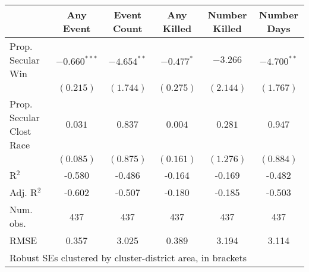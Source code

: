 
\begin{tabular}{l c c c c c }
\hline
 & Any Event & Event Count & Any Killed & Number Killed & Number Days \\
\hline
Prop. Secular Win        & $-0.660^{***}$ & $-4.654^{**}$ & $-0.477^{*}$ & $-3.266$  & $-4.700^{**}$ \\
                         & $(0.215)$      & $(1.744)$     & $(0.275)$    & $(2.144)$ & $(1.767)$     \\
Prop. Secular Clost Race & $0.031$        & $0.837$       & $0.004$      & $0.281$   & $0.947$       \\
                         & $(0.085)$      & $(0.875)$     & $(0.161)$    & $(1.276)$ & $(0.884)$     \\
\hline
R$^2$                    & -0.580         & -0.486        & -0.164       & -0.169    & -0.482        \\
Adj. R$^2$               & -0.602         & -0.507        & -0.180       & -0.185    & -0.503        \\
Num. obs.                & 437            & 437           & 437          & 437       & 437           \\
RMSE                     & 0.357          & 3.025         & 0.389        & 3.194     & 3.114         \\
\hline
\multicolumn{6}{l}{\scriptsize{Robust SEs clustered by cluster-district area, in brackets}}
\end{tabular}
